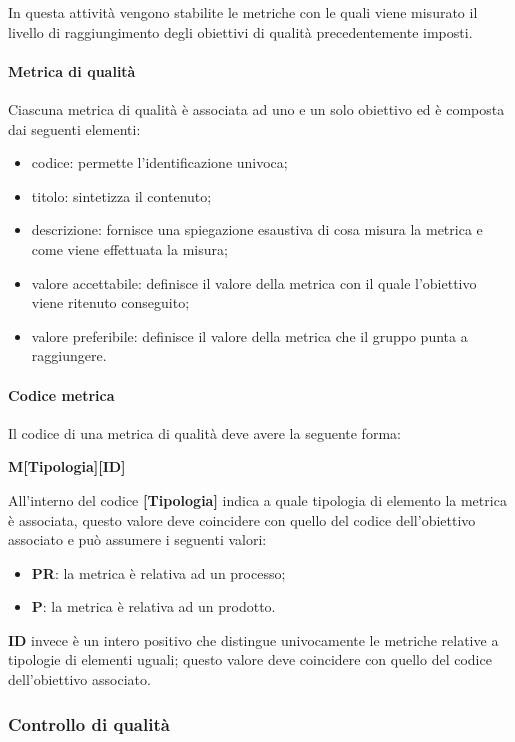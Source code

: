 In questa attività vengono stabilite le metriche con le quali viene misurato il livello di raggiungimento degli obiettivi di qualità 
precedentemente imposti.

\paragraph{Metrica di qualità}
\label{par:metrica_qualita}

Ciascuna metrica di qualità è associata ad uno e un solo obiettivo ed è composta dai seguenti elementi:
\begin{itemize}
	\item codice: permette l'identificazione univoca;
	\item titolo: sintetizza il contenuto;
	\item descrizione: fornisce una spiegazione esaustiva di cosa misura la metrica e come viene effettuata la misura;
	\item valore accettabile: definisce il valore della metrica con il quale l'obiettivo viene ritenuto conseguito;
	\item valore preferibile: definisce il valore della metrica che il gruppo punta a raggiungere.
\end{itemize}

\paragraph{Codice metrica}

Il codice di una metrica di qualità deve avere la seguente forma:
\begin{center}
    \textbf{M[Tipologia][ID]}
\end{center}
All'interno del codice \textbf{[Tipologia]} indica a quale tipologia di elemento la metrica è associata, questo valore deve coincidere con 
quello del codice dell'obiettivo associato e può assumere i seguenti valori:
\begin{itemize}
	\item \textbf{PR}: la metrica è relativa ad un processo;
	\item \textbf{P}: la metrica è relativa ad un prodotto.
\end{itemize}
\textbf{ID} invece è un intero positivo che distingue univocamente le metriche relative a tipologie di elementi uguali; questo valore deve 
coincidere con quello del codice dell'obiettivo associato.

\subsubsection{Controllo di qualità}
\label{ssub:controllo_qualita}

